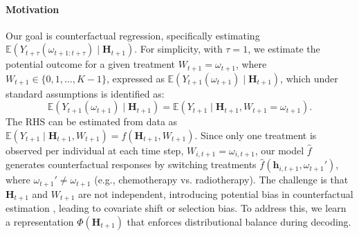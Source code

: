 \documentclass{article}
\theoremstyle{plain}
\theoremstyle{definition}
\theoremstyle{remark}
\begin{document}
\paragraph{Motivation} Our goal is counterfactual regression, specifically estimating \( \mathbb{E}(Y_{t+\tau}(\omega_{t+1:t+\tau}) \mid \mathbf{H}_{t+1}) \). For simplicity, with \( \tau = 1 \), we estimate the potential outcome for a given treatment \( W_{t+1} = \omega_{t+1} \), where \( W_{t+1} \in \{0,1, \dots, K-1\} \), expressed as \( \mathbb{E}(Y_{t+1}(\omega_{t+1}) \mid \mathbf{H}_{t+1}) \), which under standard assumptions is identified as:
\[
\mathbb{E}(Y_{t+1}(\omega_{t+1}) \mid \mathbf{H}_{t+1}) = \mathbb{E}(Y_{t+1} \mid \mathbf{H}_{t+1}, W_{t+1} = \omega_{t+1}).
\]
The RHS can be estimated from data as \( \mathbb{E}(Y_{t+1} \mid \mathbf{H}_{t+1}, W_{t+1}) = f(\mathbf{H}_{t+1}, W_{t+1}) \). Since only one treatment is observed per individual at each time step, \( W_{i,t+1} = \omega_{i,t+1} \), our model \( \hat{f} \) generates counterfactual responses by switching treatments \( \hat{f}(\mathbf{h}_{i,t+1}, \omega_{t+1}') \), where \( \omega_{t+1}' \neq \omega_{t+1} \) (e.g., chemotherapy vs. radiotherapy). The challenge is that \( \mathbf{H}_{t+1} \) and \( W_{t+1} \) are not independent, introducing potential bias in counterfactual estimation \citep{robins1999association}, leading to covariate shift or selection bias. To address this, we learn a representation \( \Phi(\mathbf{H}_{t+1}) \) that enforces distributional balance during decoding.
\end{document}
